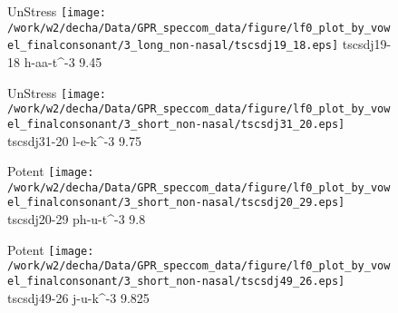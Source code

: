 \documentclass{article}
\begin{document}
\begin{figure}[t]
\begin{minipage}[b]{.24\textwidth}
UnStress
\centering
\texttt{[image: /work/w2/decha/Data/GPR\_speccom\_data/figure/lf0\_plot\_by\_vowel\_finalconsonant/3\_long\_non-nasal/tscsdj19\_18.eps]}
tscsdj19-18 h-aa-t\textasciicircum-3 9.45
\end{minipage}
\begin{minipage}[b]{.24\textwidth}
UnStress
\centering
\texttt{[image: /work/w2/decha/Data/GPR\_speccom\_data/figure/lf0\_plot\_by\_vowel\_finalconsonant/3\_short\_non-nasal/tscsdj31\_20.eps]}
tscsdj31-20 l-e-k\textasciicircum-3 9.75
\end{minipage}
\begin{minipage}[b]{.24\textwidth}
\colorbox{Apricot}{Potent}
\centering
\texttt{[image: /work/w2/decha/Data/GPR\_speccom\_data/figure/lf0\_plot\_by\_vowel\_finalconsonant/3\_short\_non-nasal/tscsdj20\_29.eps]}
tscsdj20-29 ph-u-t\textasciicircum-3 9.8
\end{minipage}
\begin{minipage}[b]{.24\textwidth}
\colorbox{Apricot}{Potent}
\centering
\texttt{[image: /work/w2/decha/Data/GPR\_speccom\_data/figure/lf0\_plot\_by\_vowel\_finalconsonant/3\_short\_non-nasal/tscsdj49\_26.eps]}
tscsdj49-26 j-u-k\textasciicircum-3 9.825
\end{minipage}
\end{figure}
\end{document}
